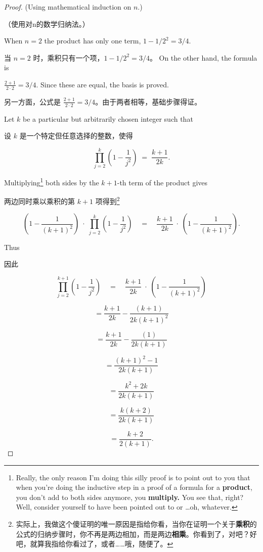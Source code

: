 \begin{proof}
(Using mathematical induction on $n$.)

（使用对n的数学归纳法。）

 When $n = 2$ the product has only one term, $1-1/2^2 = 3/4$.

当 $n = 2$ 时，乘积只有一个项，$1-1/2^2 = 3/4$。
On the other hand, the formula is 

$\displaystyle \frac{2+1}{2\cdot2} = 3/4$.  Since these are equal, the 
basis is proved.

另一方面，公式是 $\displaystyle \frac{2+1}{2\cdot2} = 3/4$。由于两者相等，基础步骤得证。



Let $k$ be a particular but arbitrarily chosen integer such that

设 $k$ 是一个特定但任意选择的整数，使得

\[ \prod_{j=2}^k \left( 1 - \frac{1}{j^2} \right) \; = \; \frac{k+1}{2k}. \]

Multiplying\footnote{Really, the only reason I'm doing this silly proof is to 
point out to you that when you're doing the inductive step in a proof of a 
formula for a {\bf product}, you don't add to both sides anymore, you {\bf multiply.} You see that, right?
Well, consider yourself to have been pointed out to or \ldots oh, whatever.}  both sides by the $k+1$-th term of the product 
gives

两边同时乘以乘积的第 $k+1$ 项得到\footnote{实际上，我做这个傻证明的唯一原因是指给你看，当你在证明一个关于{\bf 乘积}的公式的归纳步骤时，你不再是两边相加，而是两边{\bf 相乘}。你看到了，对吧？好吧，就算我指给你看过了，或者……哦，随便了。}

\[ \left( 1 - \frac{1}{(k+1)^2} \right) \; \cdot \; \prod_{j=2}^k \left( 1 - \frac{1}{j^2} \right) \quad  = \quad \frac{k+1}{2k} \; \cdot \; \left( 1 - \frac{1}{(k+1)^2} \right). \]

Thus 

因此

\[ \prod_{j=2}^{k+1} \left( 1 - \frac{1}{j^2} \right) \quad  = \quad \frac{k+1}{2k} \; \cdot \; \left( 1 - \frac{1}{(k+1)^2} \right) \]

\[ = \frac{k+1}{2k} - \frac{(k+1)}{2k(k+1)^2} \]

\[ = \frac{k+1}{2k} - \frac{(1)}{2k(k+1)} \]

\[ = \frac{(k+1)^2 - 1}{2k(k+1)} \]

\[ = \frac{k^2+2k}{2k(k+1)} \]

\[ = \frac{k (k+2)}{2k(k+1)} \]

\[ = \frac{k+2}{2(k+1)}.
\]

\end{proof}

